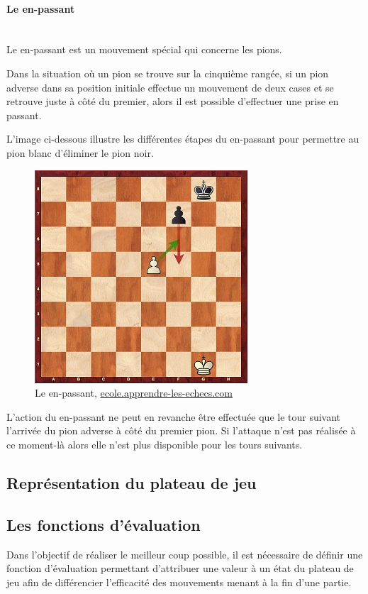 \huge\documentclass{article}
\begin{document}
    \paragraph{Le en-passant}
    ~~\\

    Le en-passant est un mouvement spécial qui concerne les pions.

    Dans la situation où un pion se trouve sur la cinquième rangée, si un pion adverse dans sa position initiale effectue un mouvement de deux cases et se retrouve juste à côté du premier, alors il est possible d'effectuer une prise en passant.

    L'image ci-dessous illustre les différentes étapes du en-passant pour permettre au pion blanc d'éliminer le pion noir.

    \begin{figure}[h]
        \centering
        \includegraphics[scale=0.8]{img/en-passant.jpg}
        \caption{Le en-passant,
            \href{https://ecole.apprendre-les-echecs.com/la-prise-en-passant/}{ecole.apprendre-les-echecs.com}}
    \end{figure}

    L'action du en-passant ne peut en revanche être effectuée que le tour suivant l'arrivée du pion adverse à côté du premier pion. Si l'attaque n'est pas réalisée à ce moment-là alors elle n'est plus disponible pour les tours suivants.

    \subsection{Représentation du plateau de jeu} \label{plateau}
    \subsection{Les fonctions d'évaluation}
    Dans l'objectif de réaliser le meilleur coup possible, il est nécessaire de définir une fonction d'évaluation permettant d'attribuer une valeur à un état du plateau de jeu afin de différencier l'efficacité des mouvements menant à la fin d'une partie.
\end{document}
